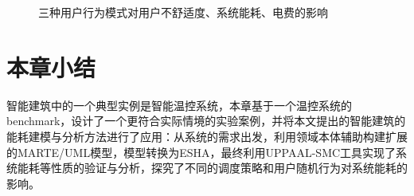 	\begin{figure}
	\centering
	\caption{三种用户行为模式对用户不舒适度、系统能耗、电费的影响}
	\label{3user}
	\end{figure}
	

\section{本章小结}
	智能建筑中的一个典型实例是智能温控系统，本章基于一个温控系统的benchmark，设计了一个更符合实际情境的实验案例，并将本文提出的智能建筑的能耗建模与分析方法进行了应用：从系统的需求出发，利用领域本体辅助构建扩展的MARTE/UML模型，模型转换为ESHA，最终利用UPPAAL-SMC工具实现了系统能耗等性质的验证与分析，探究了不同的调度策略和用户随机行为对系统能耗的影响。

	
	
	